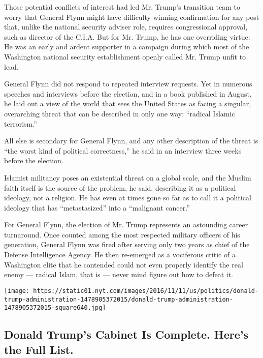 Those potential conflicts of interest had led Mr. Trump's transition
team to worry that General Flynn might have difficulty winning
confirmation for any post that, unlike the national security adviser
role, requires congressional approval, such as director of the C.I.A.
But for Mr. Trump, he has one overriding virtue: He was an early and
ardent supporter in a campaign during which most of the Washington
national security establishment openly called Mr. Trump unfit to lead.

General Flynn did not respond to repeated interview requests. Yet in
numerous speeches and interviews before the election, and in a book
published in August, he laid out a view of the world that sees the
United States as facing a singular, overarching threat that can be
described in only one way: ``radical Islamic terrorism.''

All else is secondary for General Flynn, and any other description of
the threat is ``the worst kind of political correctness,'' he said in an
interview three weeks before the election.

Islamist militancy poses an existential threat on a global scale, and
the Muslim faith itself is the source of the problem, he said,
describing it as a political ideology, not a religion. He has even at
times gone so far as to call it a political ideology that has
``metastasized'' into a ``malignant cancer.''

For General Flynn, the election of Mr. Trump represents an astounding
career turnaround. Once counted among the most respected military
officers of his generation, General Flynn was fired after serving only
two years as chief of the Defense Intelligence Agency. He then
re-emerged as a vociferous critic of a Washington elite that he
contended could not even properly identify the real enemy --- radical
Islam, that is --- never mind figure out how to defeat it.

\href{https://www.nytimes.com/interactive/2016/us/politics/donald-trump-administration.html}{}

\texttt{[image: https://static01.nyt.com/images/2016/11/11/us/politics/donald-trump-administration-1478905372015/donald-trump-administration-1478905372015-square640.jpg]}

\hypertarget{donald-trumps-cabinet-is-complete-heres-the-full-list}{%
\subsection{Donald Trump's Cabinet Is Complete. Here's the Full
List.}\label{donald-trumps-cabinet-is-complete-heres-the-full-list}}

